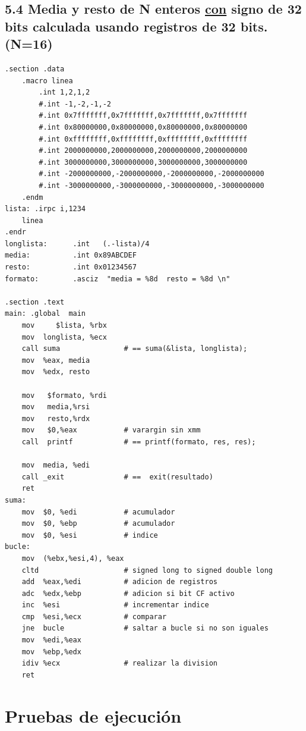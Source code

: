 	\subsection{5.4 Media y resto de N enteros \underline{con} signo de 32 bits calculada usando registros de 32 bits. (N=16)}
	
	\lstset{language=[x64]Assembler}
	\begin{lstlisting}[frame=single]  
.section .data
	.macro linea
		.int 1,2,1,2
		#.int -1,-2,-1,-2
		#.int 0x7fffffff,0x7fffffff,0x7fffffff,0x7fffffff
		#.int 0x80000000,0x80000000,0x80000000,0x80000000
		#.int 0xffffffff,0xffffffff,0xffffffff,0xffffffff
		#.int 2000000000,2000000000,2000000000,2000000000
		#.int 3000000000,3000000000,3000000000,3000000000
		#.int -2000000000,-2000000000,-2000000000,-2000000000
		#.int -3000000000,-3000000000,-3000000000,-3000000000
	.endm
lista: .irpc i,1234
	linea
.endr
longlista:      .int   (.-lista)/4
media:          .int 0x89ABCDEF
resto:          .int 0x01234567
formato:        .asciz  "media = %8d  resto = %8d \n"

.section .text
main: .global  main
	mov     $lista, %rbx
	mov  longlista, %ecx
	call suma               # == suma(&lista, longlista);
	mov  %eax, media
	mov  %edx, resto
	
	mov   $formato, %rdi
	mov   media,%rsi
	mov   resto,%rdx
	mov   $0,%eax           # varargin sin xmm
	call  printf            # == printf(formato, res, res);
	
	mov  media, %edi
	call _exit              # ==  exit(resultado)
	ret
suma:
	mov  $0, %edi           # acumulador
	mov  $0, %ebp           # acumulador
	mov  $0, %esi           # indice
bucle:
	mov  (%ebx,%esi,4), %eax
	cltd                    # signed long to signed double long
	add  %eax,%edi          # adicion de registros
	adc  %edx,%ebp          # adicion si bit CF activo
	inc  %esi               # incrementar indice
	cmp  %esi,%ecx          # comparar
	jne  bucle              # saltar a bucle si no son iguales
	mov  %edi,%eax
	mov  %ebp,%edx
	idiv %ecx               # realizar la division
	ret	
	\end{lstlisting}
	
	\section[Pruebas de ejecución]{Pruebas de ejecución}
	
